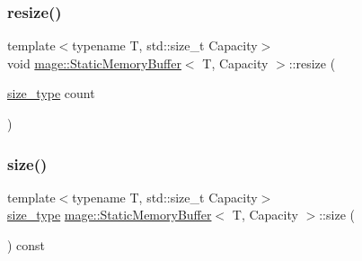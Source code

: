 \mbox{\label{classmage_1_1_static_memory_buffer_a8b0ee58cf5454f1998cfc50076cef1de}} 
\subsubsection{\texorpdfstring{resize()}{resize()}}
{\footnotesize\ttfamily template$<$typename T, std\+::size\+\_\+t Capacity$>$ \\
void \mbox{\hyperlink{classmage_1_1_static_memory_buffer}{mage\+::\+Static\+Memory\+Buffer}}$<$ T, Capacity $>$\+::resize (\begin{DoxyParamCaption}\item[{\mbox{\hyperlink{classmage_1_1_static_memory_buffer_a13e19b7af61a49400c5be360f09aadc8}{size\+\_\+type}}}]{count }\end{DoxyParamCaption})\hspace{0.3cm}{\ttfamily [noexcept]}}

\mbox{\label{classmage_1_1_static_memory_buffer_a9c39b1c5999312a6701e8db0ed4ca82e}} 
\subsubsection{\texorpdfstring{size()}{size()}}
{\footnotesize\ttfamily template$<$typename T, std\+::size\+\_\+t Capacity$>$ \\
\mbox{\hyperlink{classmage_1_1_static_memory_buffer_a13e19b7af61a49400c5be360f09aadc8}{size\+\_\+type}} \mbox{\hyperlink{classmage_1_1_static_memory_buffer}{mage\+::\+Static\+Memory\+Buffer}}$<$ T, Capacity $>$\+::size (\begin{DoxyParamCaption}{ }\end{DoxyParamCaption}) const\hspace{0.3cm}{\ttfamily [noexcept]}}

\mbox{\label{classmage_1_1_static_memory_buffer_a2e0940b76a3913d872a90de48a1ab165}} 
